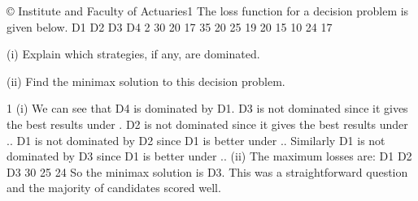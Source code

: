 

© Institute and Faculty of Actuaries1
The loss function for a decision problem is given below.
D1
D2
D3
D4
2
  
30
20
17
35 20
25
19
20 15
10
24
17
\item (i) Explain which strategies, if any, are dominated.
\item (ii) Find the minimax solution to this decision problem.

1
(i)
We can see that D4 is dominated by D1.
D3 is not dominated since it gives the best results under  .
D2 is not dominated since it gives the best results under  \theta  ..
D1 is not dominated by D2 since D1 is better under \theta  {} \theta  .. Similarly D1 is
not dominated by D3 since D1 is better under \theta  {} \theta  ..
(ii)
The maximum losses are:
D1
D2
D3
30
25
24
So the minimax solution is D3.
This was a straightforward question and the majority of candidates scored well.
